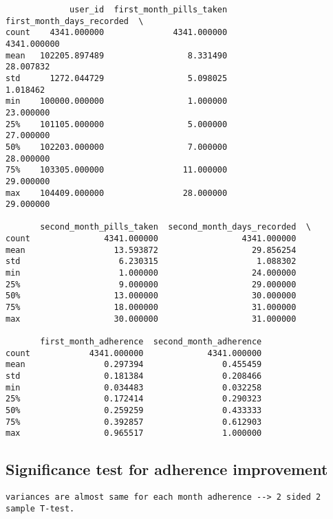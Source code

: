 \documentclass[11pt]{article}
\begin{document}
    
    \begin{verbatim}
             user_id  first_month_pills_taken  first_month_days_recorded  \
count    4341.000000              4341.000000                4341.000000   
mean   102205.897489                 8.331490                  28.007832   
std      1272.044729                 5.098025                   1.018462   
min    100000.000000                 1.000000                  23.000000   
25%    101105.000000                 5.000000                  27.000000   
50%    102203.000000                 7.000000                  28.000000   
75%    103305.000000                11.000000                  29.000000   
max    104409.000000                28.000000                  29.000000   

       second_month_pills_taken  second_month_days_recorded  \
count               4341.000000                 4341.000000   
mean                  13.593872                   29.856254   
std                    6.230315                    1.088302   
min                    1.000000                   24.000000   
25%                    9.000000                   29.000000   
50%                   13.000000                   30.000000   
75%                   18.000000                   31.000000   
max                   30.000000                   31.000000   

       first_month_adherence  second_month_adherence  
count            4341.000000             4341.000000  
mean                0.297394                0.455459  
std                 0.181384                0.208466  
min                 0.034483                0.032258  
25%                 0.172414                0.290323  
50%                 0.259259                0.433333  
75%                 0.392857                0.612903  
max                 0.965517                1.000000  
    \end{verbatim}

    
    \hypertarget{significance-test-for-adherence-improvement}{%
\subsection{Significance test for adherence
improvement}\label{significance-test-for-adherence-improvement}}

\begin{verbatim}
variances are almost same for each month adherence --> 2 sided 2 sample T-test. 
\end{verbatim}
\end{document}
